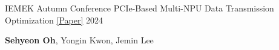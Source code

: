 \begin{cventries}
    \cvpaper
    {IEMEK Autumn Conference} %
    {{PCIe-Based Multi-NPU Data Transmission Optimization}
    \href{https://drive.google.com/file/d/1a2vqfotT8pD6IqkjK4KRzLn5nX6hFdeu}{[Paper]}
    } %
    {} %
    {2024} %
    {
      \begin{cvitems} %
        \item{\textbf{Sehyeon Oh}, Yongin Kwon, Jemin Lee}
      \end{cvitems}
    }



    

\end{cventries}
